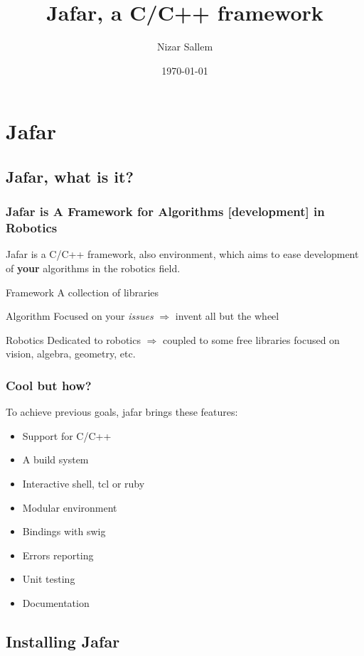 \documentclass[pdf]{beamer}
\title{Jafar, a C/C++ framework}
\author{Nizar Sallem}
\date{\today}
\begin{document}
\frame{\titlepage}

\section[Outline]{}
\frame{\tableofcontents}

\section{Jafar}
\subsection{Jafar, what is it?}
\begin{frame}
  \frametitle{Jafar is A Framework for Algorithms [development] in Robotics}
  Jafar is a C/C++ framework, also environment, which aims to ease development of \textbf{your} algorithms in the robotics field. 
  \begin{block}{Framework}
    A collection of libraries 
  \end{block}
  \begin{block}{Algorithm}
    Focused on your \textit{issues} $\Rightarrow$ invent all but the wheel
  \end{block}
  \begin{block}{Robotics}
    Dedicated to robotics $\Rightarrow$ coupled to some free libraries focused on vision, algebra, geometry, etc.
  \end{block}
\end{frame}
\begin{frame}
  \frametitle{Cool but how?}
  To achieve previous goals, jafar brings these features:
  \begin{itemize}
  \item  Support for C/C++ 
  \item  A build system 
  \item  Interactive shell, tcl or ruby 
  \item  Modular environment 
  \item  Bindings with swig 
  \item  Errors reporting 
  \item  Unit testing 
  \item  Documentation 
  \end{itemize}
\end{frame}
\subsection{Installing Jafar}
\end{document}
